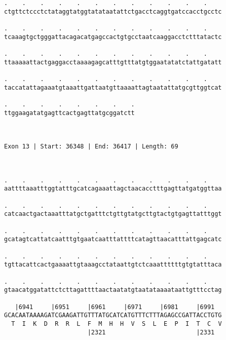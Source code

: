 \documentclass{article}
\begin{document}
\begin{Verbatim}
.    .    .    .    .    .    .    .    .    .    .    .    
ctgttctccctctataggtatggtatataatattctgacctcaggtgatccacctgcctc
                                                            
.    .    .    .    .    .    .    .    .    .    .    .    
tcaaagtgctgggattacagacatgagccactgtgcctaatcaaggacctctttatactc
                                                            
.    .    .    .    .    .    .    .    .    .    .    .    
ttaaaaattactgaggacctaaaagagcatttgtttatgtggaatatatctattgatatt
                                                            
.    .    .    .    .    .    .    .    .    .    .    .    
taccatattagaaatgtaaattgattaatgttaaaattagtaatattatgcgttggtcat
                                                            
.    .    .    .    .    .    .    .
ttggaagatatgagttcactgagttatgcggatctt
                                    
                                    
 
Exon 13 | Start: 36348 | End: 36417 | Length: 69



.    .    .    .    .    .    .    .    .    .    .    .    
aattttaaatttggtatttgcatcagaaattagctaacacctttgagttatgatggttaa
                                                            
.    .    .    .    .    .    .    .    .    .    .    .    
catcaactgactaaatttatgctgatttctgttgtatgcttgtactgtgagttatttggt
                                                            
.    .    .    .    .    .    .    .    .    .    .    .    
gcatagtcattatcaatttgtgaatcaatttattttcatagttaacatttattgagcatc
                                                            
.    .    .    .    .    .    .    .    .    .    .    .    
tgttacattcactgaaaattgtaaagcctataattgtctcaaattttttgtgtatttaca
                                                            
.    .    .    .    .    .    .    .    .    .    .    .    
gtaacatggatattctcttagattttaactaatatgtaatataaaataattgtttcctag
                                                            
   |6941     |6951     |6961     |6971     |6981     |6991  
GCACAATAAAAGATCGAAGATTGTTTATGCATCATGTTTCTTTAGAGCCGATTACCTGTG
  T  I  K  D  R  R  L  F  M  H  H  V  S  L  E  P  I  T  C  V
                       |2321                         |2331  
  

\end{Verbatim}
\end{document}
